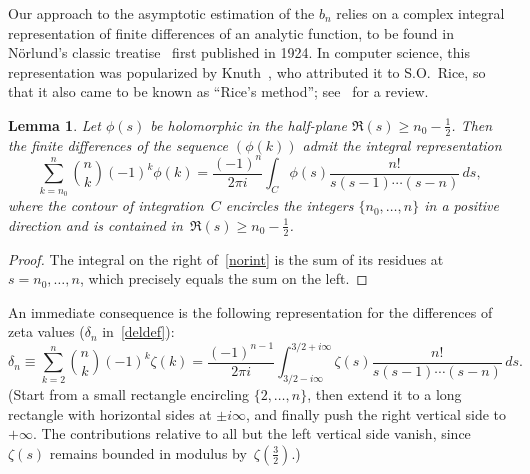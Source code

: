 \documentclass{amsart}
\newtheorem{lemma}{Lemma}
\begin{document}
Our approach to the asymptotic estimation of the $b_n$ relies on
a complex integral representation of finite differences of an analytic function,
to be found in N\"orlund's classic treatise~\cite[\S VIII.5]{Norlund54} first published in 1924.
In computer science, this representation was popularized by Knuth~\cite{Knuth98a},
who attributed it to S.O.~Rice, so that
it also came to be known as ``Rice's method''; see~\cite{FlSe95}
for  a review. 

\begin{lemma} Let $\phi(s)$ be holomorphic in the half-plane 
$\Re(s)\ge n_0-\frac12$. Then the finite differences of the sequence
$(\phi(k))$ admit the integral representation
\begin{equation}\label{norint}
\sum_{k=n_0}^n \binom{n}{k}(-1)^k\phi(k)=\frac{(-1)^{n}}{2\pi i}\int_C 
\phi(s) \frac{n!}{s(s-1)\cdots(s-n)}\, ds,
\end{equation}
where the contour of integration~$C$ encircles the integers $\{n_0,\ldots,n\}$
in a positive direction and is contained in~$\Re(s)\ge n_0-\frac12$.
\end{lemma}
\begin{proof}
The integral on the right of~\eqref{norint} is the sum of its residues at~$s=n_0,\ldots,n$,
which precisely equals the sum on the left.
\end{proof}

An immediate consequence is the following representation for the 
differences of zeta values ($\delta_n$ in~\eqref{deldef}):
\begin{equation}\label{norbn}
\delta_n\equiv \sum_{k=2}^n \binom{n}{k}(-1)^k\zeta(k)
=\frac{(-1)^{n-1}}{2\pi i}\int_{3/2-i\infty}^{3/2+i\infty} 
\zeta(s) \frac{n!}{s(s-1)\cdots(s-n)}\, ds. 
\end{equation}
(Start from a small rectangle encircling $\{2,\ldots,n\}$, then 
extend it to a long rectangle with horizontal sides at $\pm i\infty$,
and finally push the right vertical side to $+\infty$.
The contributions relative to 
all but the left vertical side vanish,
since $\zeta(s)$ remains bounded in modulus by~$\zeta(\frac32)$.)
\end{document}
